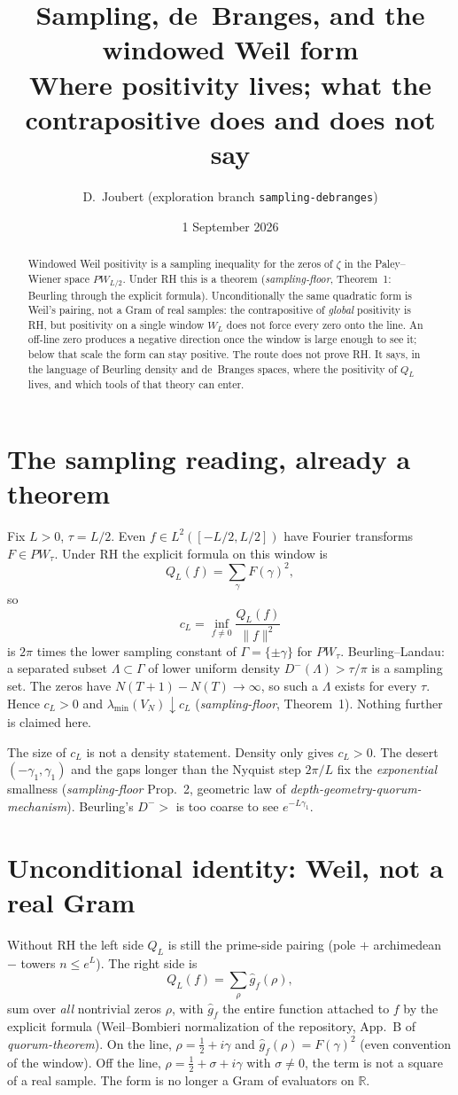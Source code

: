 \documentclass[11pt]{article}
\title{Sampling, de~Branges, and the windowed Weil form\\
\large Where positivity lives; what the contrapositive does and does not say}
\author{D.\ Joubert (exploration branch \texttt{sampling-debranges})}
\date{1 September 2026}
\theoremstyle{remark}\newtheorem*{remark}{Remark}
\begin{document}
\maketitle
\begin{abstract}
\noindent
Windowed Weil positivity is a sampling inequality for the zeros of $\zeta$
in the Paley--Wiener space $PW_{L/2}$. Under RH this is a theorem
(\emph{sampling-floor}, Theorem~1: Beurling through the explicit formula).
Unconditionally the same quadratic form is Weil's pairing, not a Gram of
real samples: the contrapositive of \emph{global} positivity is RH, but
positivity on a single window $W_L$ does not force every zero onto the
line. An off-line zero produces a negative direction once the window is
large enough to see it; below that scale the form can stay positive.
The route does not prove RH. It says, in the language of Beurling density
and de~Branges spaces, where the positivity of $Q_L$ lives, and which
tools of that theory can enter.
\end{abstract}

\section{The sampling reading, already a theorem}
Fix $L>0$, $\tau=L/2$. Even $f\in L^2([-L/2,L/2])$ have Fourier transforms
$F\in PW_\tau$. Under RH the explicit formula on this window is
\[
Q_L(f)=\sum_{\gamma}F(\gamma)^2,
\]
so
\[
c_L=\inf_{f\ne0}\frac{Q_L(f)}{\|f\|^2}
\]
is $2\pi$ times the lower sampling constant of $\Gamma=\{\pm\gamma\}$ for
$PW_\tau$. Beurling--Landau: a separated subset $\Lambda\subset\Gamma$ of
lower uniform density $D^-(\Lambda)>\tau/\pi$ is a sampling set. The zeros
have $N(T+1)-N(T)\to\infty$, so such a $\Lambda$ exists for every $\tau$.
Hence $c_L>0$ and $\lambda_{\min}(V_N)\downarrow c_L$
(\emph{sampling-floor}, Theorem~1). Nothing further is claimed here.

The size of $c_L$ is not a density statement. Density only gives $c_L>0$.
The desert $(-\gamma_1,\gamma_1)$ and the gaps longer than the Nyquist
step $2\pi/L$ fix the \emph{exponential} smallness
(\emph{sampling-floor} Prop.~2, geometric law of
\emph{depth-geometry-quorum-mechanism}). Beurling's $D^->$ is too coarse
to see $e^{-L\gamma_1}$.

\section{Unconditional identity: Weil, not a real Gram}
Without RH the left side $Q_L$ is still the prime-side pairing (pole $+$
archimedean $-$ towers $n\le e^L$). The right side is
\[
Q_L(f)=\sum_{\rho}\hat g_f(\rho),
\]
sum over \emph{all} nontrivial zeros $\rho$, with $\hat g_f$ the entire
function attached to $f$ by the explicit formula (Weil--Bombieri
normalization of the repository, App.~B of \emph{quorum-theorem}).
On the line, $\rho=\tfrac12+i\gamma$ and $\hat g_f(\rho)=F(\gamma)^2$
(even convention of the window). Off the line,
$\rho=\tfrac12+\sigma+i\gamma$ with $\sigma\ne0$, the term is not a
square of a real sample. The form is no longer a Gram of evaluators on
$\mathbb{R}$.
\end{document}
